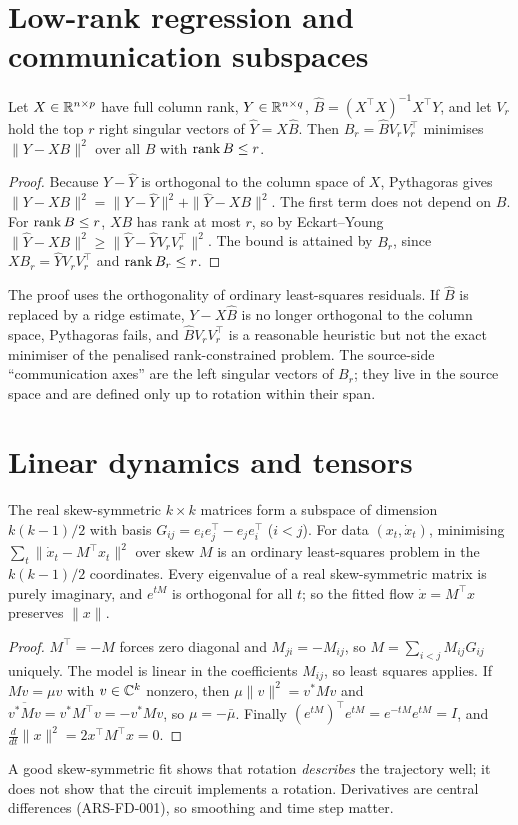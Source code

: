 \section{Low-rank regression and communication subspaces}
\begin{theorem}\label{ars:rrr-001}
Let $X\in\mathbb R^{n\times p}$ have full column rank, $Y\in\mathbb R^{n\times q}$, $\hat B=(X^\top X)^{-1}X^\top Y$, and let $V_r$ hold the top $r$ right singular vectors of $\hat Y=X\hat B$. Then $B_r=\hat BV_rV_r^\top$ minimises $\|Y-XB\|^2$ over all $B$ with $\operatorname{rank} B\le r$.
\end{theorem}
\begin{proof}
Because $Y-\hat Y$ is orthogonal to the column space of $X$, Pythagoras gives $\|Y-XB\|^2=\|Y-\hat Y\|^2+\|\hat Y-XB\|^2$. The first term does not depend on $B$. For $\operatorname{rank} B\le r$, $XB$ has rank at most $r$, so by Eckart--Young $\|\hat Y-XB\|^2\ge\|\hat Y-\hat YV_rV_r^\top\|^2$. The bound is attained by $B_r$, since $XB_r=\hat YV_rV_r^\top$ and $\operatorname{rank} B_r\le r$.
\end{proof}
\begin{remark}
The proof uses the orthogonality of ordinary least-squares residuals. If $\hat B$ is replaced by a ridge estimate, $Y-X\hat B$ is no longer orthogonal to the column space, Pythagoras fails, and $\hat BV_rV_r^\top$ is a reasonable heuristic but not the exact minimiser of the penalised rank-constrained problem. The source-side ``communication axes'' are the left singular vectors of $B_r$; they live in the source space and are defined only up to rotation within their span.
\end{remark}

\section{Linear dynamics and tensors}
\begin{theorem}\label{ars:jpca-001}
The real skew-symmetric $k\times k$ matrices form a subspace of dimension $k(k-1)/2$ with basis $G_{ij}=e_ie_j^\top-e_je_i^\top$ ($i<j$). For data $(x_t,\dot x_t)$, minimising $\sum_t\|\dot x_t-M^\top x_t\|^2$ over skew $M$ is an ordinary least-squares problem in the $k(k-1)/2$ coordinates. Every eigenvalue of a real skew-symmetric matrix is purely imaginary, and $e^{tM}$ is orthogonal for all $t$; so the fitted flow $\dot x=M^\top x$ preserves $\|x\|$.
\end{theorem}
\begin{proof}
$M^\top=-M$ forces zero diagonal and $M_{ji}=-M_{ij}$, so $M=\sum_{i<j}M_{ij}G_{ij}$ uniquely. The model is linear in the coefficients $M_{ij}$, so least squares applies. If $Mv=\mu v$ with $v\in\mathbb C^k$ nonzero, then $\mu\|v\|^2=v^*Mv$ and $\overline{v^*Mv}=v^*M^\top v=-v^*Mv$, so $\mu=-\bar\mu$. Finally $(e^{tM})^\top e^{tM}=e^{-tM}e^{tM}=I$, and $\frac{d}{dt}\|x\|^2=2x^\top M^\top x=0$.
\end{proof}
A good skew-symmetric fit shows that rotation \emph{describes} the trajectory well; it does not show that the circuit implements a rotation. Derivatives are central differences (ARS-FD-001), so smoothing and time step matter.

